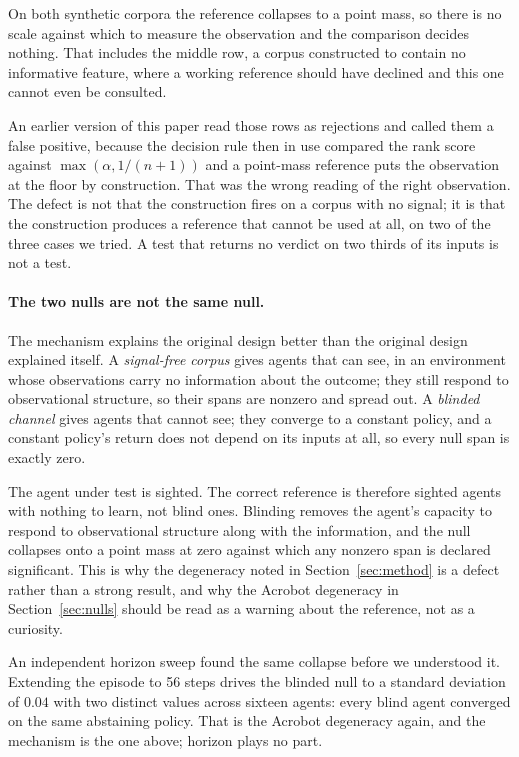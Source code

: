 \documentclass[10pt,twocolumn]{article}
\begin{document}
On both synthetic corpora the reference collapses to a point mass, so there is
no scale against which to measure the observation and the comparison decides
nothing. That includes the middle row, a corpus constructed to contain no
informative feature, where a working reference should have declined and
this one cannot even be consulted.

An earlier version of this paper read those rows as rejections and called them
a false positive, because the decision rule then in use compared the rank score
against $\max(\alpha, 1/(n+1))$ and a point-mass reference puts the observation
at the floor by construction. That was the wrong reading of the right
observation. The defect is not that the construction fires on a corpus with no
signal; it is that the construction produces a reference that cannot be used at
all, on two of the three cases we tried. A test that returns no verdict on
two thirds of its inputs is not a test.

\paragraph{The two nulls are not the same null.}
The mechanism explains the original design better than the original design
explained itself. A \emph{signal-free corpus} gives agents that can see, in an
environment whose observations carry no information about the outcome; they
still respond to observational structure, so their spans are nonzero and spread
out. A \emph{blinded channel} gives agents that cannot see; they converge to a
constant policy, and a constant policy's return does not depend on its inputs at
all, so every null span is exactly zero.

The agent under test is sighted. The correct reference is therefore sighted
agents with nothing to learn, not blind ones. Blinding removes the agent's
capacity to respond to observational structure along with the information, and
the null collapses onto a point mass at zero against which any nonzero span is
declared significant. This is why the degeneracy noted in
Section~\ref{sec:method} is a defect rather than a strong result, and why the
Acrobot degeneracy in Section~\ref{sec:nulls} should be read as a warning about
the reference, not as a curiosity.

An independent horizon sweep found the same collapse before we understood it.
Extending the episode to 56 steps drives the blinded null to a standard
deviation of $0.04$ with two distinct values across sixteen agents: every blind
agent converged on the same abstaining policy. That is the Acrobot degeneracy
again, and the mechanism is the one above; horizon plays no part.
\end{document}
